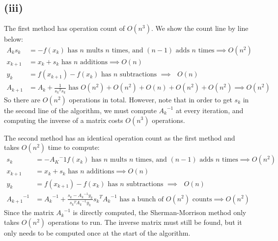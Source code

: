 \documentclass[11pt]{amsart}
\begin{document}
\subsection*{(iii)}
The first method has operation count of $O(n^{3})$. We show the count line by line below:
\begin{align*}
A_{k}s_{k} &= -f(x_{k})  \text { has $n$ mults $n$ times, and $(n-1)$ adds $n$ times} \implies \text{$O(n^{2})$}\\
x_{k+1} &= x_{k} + s_{k} \text{ has $n$ additions}  \implies \text{$O(n)$}\\
y_k &= f(x_{k+1}) - f(x_k)  \text{ has $n$ subtractions $\implies$ $O(n)$}\\
A_{k+1} &= A_k + \frac{1}{{s_k}^Ts_k} \text{ has } O(n^2) + O(n^2) + O(n) + O(n^2) + O(n^2) \implies O(n^2)
\end{align*}
So there are $O(n^2)$ operations in total. However, note that in order to get $s_k$ in the second line of the algorithm, we must compute ${A_k}^{-1}$ at every iteration, and computing the inverse of a matrix costs $O(n^3)$ operations.

The second method has an identical operation count as the first method and takes $O(n^2)$ time to compute:
\begin{align*}
s_{k} &= {-A_K}^-1f(x_{k})  \text { has $n$ mults $n$ times, and $(n-1)$ adds $n$ times} \implies \text{$O(n^{2})$}\\
x_{k+1} &= x_{k} + s_{k} \text{ has $n$ additions}  \implies \text{$O(n)$}\\
y_k &= f(x_{k+1}) - f(x_k)  \text{ has $n$ subtractions $\implies$ $O(n)$}\\
{A_{k+1}}^{-1} &= {A_k}^{-1} + \frac{s_k - {A_k}^{-1}y_k}{{s_k}^T{A_k}^{-1}y_k}{s_k}^T{A_k}^{-1} \text{ has a bunch of $O(n^2)$ counts} \implies O(n^2)
\end{align*}
Since the matrix ${A_k}^{-1}$ is directly computed, the Sherman-Morrison method only takes $O(n^2)$ operations to run. The inverse matrix must still be found, but it only needs to be computed once at the start of the algorithm.
\end{document}
